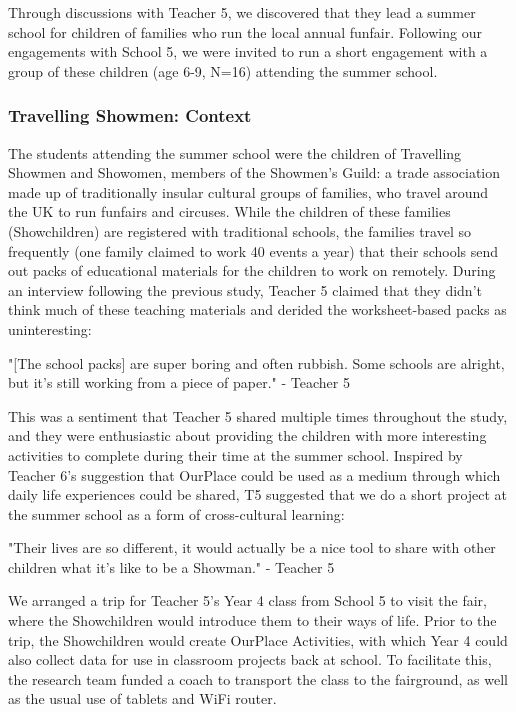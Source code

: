 Through discussions with Teacher 5, we discovered that they lead a summer school for children of families who run the local annual funfair. Following our engagements with School 5, we were invited to run a short engagement with a group of these children (age 6-9, N=16) attending the summer school.

\subsubsection{Travelling Showmen: Context}

The students attending the summer school were the children of Travelling Showmen and Showomen, members of the Showmen's Guild: a trade association made up of traditionally insular cultural groups of families, who travel around the UK to run funfairs and circuses. While the children of these families (Showchildren) are registered with traditional schools, the families travel so frequently (one family claimed to work 40 events a year) that their schools send out packs of educational materials for the children to work on remotely. During an interview following the previous study, Teacher 5 claimed that they didn't think much of these teaching materials and derided the worksheet-based packs as uninteresting: 

\begin{displayquote}
"[The school packs] are super boring and often rubbish. Some schools are alright, but it's still working from a piece of paper." - Teacher 5
\end{displayquote}

This was a sentiment that Teacher 5 shared multiple times throughout the study, and they were enthusiastic about providing the children with more interesting activities to complete during their time at the summer school. Inspired by Teacher 6's suggestion that OurPlace could be used as a medium through which daily life experiences could be shared, T5 suggested that we do a short project at the summer school as a form of cross-cultural learning: 
\begin{displayquote}
"Their lives are so different, it would actually be a nice tool to share with other children what it's like to be a Showman." - Teacher 5
\end{displayquote}

We arranged a trip for Teacher 5's Year 4 class from School 5 to visit the fair, where the Showchildren would introduce them to their ways of life. Prior to the trip, the Showchildren would create OurPlace Activities, with which Year 4 could also collect data for use in classroom projects back at school. To facilitate this, the research team funded a coach to transport the class to the fairground, as well as the usual use of tablets and WiFi router.

